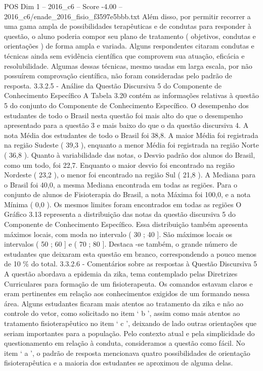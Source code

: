 \begin{textsample}{POS Dim 1 – 2016\_c6 – Score -4.00 – 2016\_c6/enade\_2016\_fisio\_f3597e5bbb.txt}
Além disso, por permitir recorrer a uma gama ampla de possibilidades terapêuticas e de condutas para responder à questão, o aluno poderia compor seu plano de tratamento ( objetivos, condutas e orientações ) de forma ampla e variada.
Alguns respondentes citaram condutas e técnicas ainda sem evidência científica que comprovem sua atuação, eficácia e resolubilidade.
Algumas dessas técnicas, mesmo usadas em larga escala, por não possuírem comprovação científica, não foram consideradas pelo padrão de resposta. 3.3.2.5 - Análise da Questão Discursiva 5 do Componente de Conhecimento Específico A Tabela 3.20 contém as informações relativas à questão 5 do conjunto do Componente de Conhecimento Específico.
O desempenho dos estudantes de todo o Brasil nesta questão foi mais alto do que o desempenho apresentado para a questão 3 e mais baixo do que o da questão discursiva 4.
A nota Média dos estudantes de todo o Brasil foi 38,8.
A maior Média foi registrada na região Sudeste ( 39,3 ), enquanto a menor Média foi registrada na região Norte ( 36,8 ).
Quanto à variabilidade das notas, o Desvio padrão dos alunos do Brasil, como um todo, foi 22,7.
Enquanto o maior desvio foi encontrado na região Nordeste ( 23,2 ), o menor foi encontrado na região Sul ( 21,8 ).
A Mediana para o Brasil foi 40,0, a mesma Mediana encontrada em todas as regiões.
Para o conjunto de alunos de Fisioterapia do Brasil, a nota Máxima foi 100,0, e a nota Mínima ( 0,0 ).
Os mesmos limites foram encontrados em todas as regiões O Gráfico 3.13 representa a distribuição das notas da questão discursiva 5 do Componente de Conhecimento Específico.
Essa distribuição também apresenta máximos locais, com moda no intervalo ( 30 ; 40 ].
São máximos locais os intervalos ( 50 ; 60 ] e ( 70 ; 80 ].
Destaca -se também, o grande número de estudantes que deixaram esta questão em branco, correspondendo a pouco menos de 10 \% do total. 3.3.2.6 - Comentários sobre as respostas à Questão Discursiva 5 A questão abordava a epidemia da zika, tema contemplado pelas Diretrizes Curriculares para formação de um fisioterapeuta.
Os comandos estavam claros e eram pertinentes em relação aos conhecimentos exigidos de um formando nessa área.
Alguns estudantes ficaram mais atentos ao tratamento da zika e não ao controle do vetor, como solicitado no item ‘ b ’, assim como mais atentos ao tratamento fisioterapêutico no item ‘ c ’, deixando de lado outras orientações que seriam importantes para a população.
Pelo contexto atual e pela simplicidade do questionamento em relação à conduta, consideramos a questão como fácil.
No item ‘ a ’, o padrão de resposta mencionava quatro possibilidades de orientação fisioterapêutica e a maioria dos estudantes se aproximou de alguma delas.

\end{textsample}

